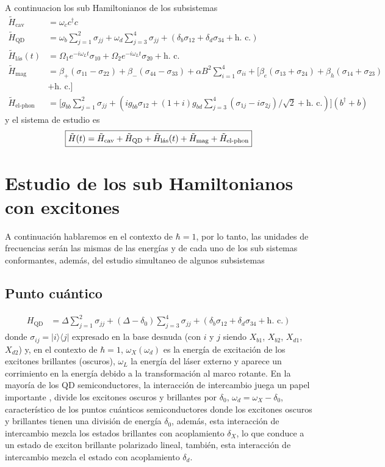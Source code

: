 \documentclass[main.tex]{subfiles}
\begin{document}
A continuacion los sub Hamiltonianos de los subsistemas
\begin{align}
    \tilde{H}_\text{cav} &= \omega_c c^\dagger c\\
    \tilde{H}_\text{QD} &= \omega_b \sum_{j=1}^{2}\sigma_{jj} + \omega_d \sum_{j=3}^{4}\sigma_{jj} + (\delta_b\sigma_{12} + \delta_d\sigma_{34} + \text{h. c.})\\
    \tilde{H}_\text{l\'as}(t) &= \Omega_1 e^{-i\omega_L t} \sigma_{10} + \Omega_2 e^{-i\omega_L t} \sigma_{20} + \text{h. c.}\\
    \tilde{H}_\text{mag} &= \beta_+ (\sigma_{11} - \sigma_{22}) + \beta_- (\sigma_{44} - \sigma_{33}) + \alpha B^2 \sum_{i = 1}^{4} \sigma_{ii} + [\beta_e (\sigma_{13} + \sigma_{24}) + \beta_h (\sigma_{14} + \sigma_{23})\\
    &+ \text{h. c.}]\\
    \tilde{H}_\text{el-phon} &= \big[ g_{bb} \sum_{j=1}^2 \sigma_{jj} + (ig_{bb}\sigma_{12} + (1+i) g_{bd} \sum_{j=3}^4 (\sigma_{1j} - i\sigma_{2j})/\sqrt{2} + \text{h. c.}) \big](b^\dagger + b)
\end{align}
y el sistema de estudio es
\[
\fbox{$\tilde{H}(t) = \tilde{H}_\text{cav} + \tilde{H}_\text{QD} + \tilde{H}_\text{l\'as}(t) + \tilde{H}_\text{mag} + \tilde{H}_\text{el-phon}$}
\]
\chapter{Estudio de los sub Hamiltonianos con excitones}
A continuación hablaremos en el contexto de $\hbar=1$, por lo tanto, las unidades de frecuencias serán las mismas de las energías y de cada uno de los sub sistemas conformantes, además, del estudio simultaneo de algunos subsistemas 
\section{Punto cuántico}
\begin{align*}
    H_\text{QD} &=  \Delta \sum_{j=1}^{2}\sigma_{jj} + (\Delta - \delta_0) \sum_{j=3}^{4}\sigma_{jj} + (\delta_b\sigma_{12} + \delta_d\sigma_{34} + \text{h. c.})
\end{align*}
donde $\sigma_{ij} =|i\rangle\langle j|$ expresado en la base desnuda (con $i$ y $j$ siendo $X_{b1}$, $X_{b2}$, $X_{d1}$, $X_{d2}$) y, en el contexto de $\hbar = 1$, $\omega_X(\omega_d)$ es la energía de excitación de los excitones brillantes (oscuros), $\omega_L$ la energía del láser externo y aparece un corrimiento en la energía debido a la transformación al marco rotante. En la mayoría de los QD semiconductores, la interacción de intercambio juega un papel importante \parencite{Bayer2002}, divide los excitones oscuros y brillantes por $\delta_0$,  $\omega_d = \omega_X -\delta_0$, característico de los puntos cuánticos semiconductores donde los excitones oscuros y brillantes tienen una división de energía $\delta_0$, además, esta interacción de intercambio mezcla los estados brillantes con acoplamiento $\delta_X$, lo que conduce a un estado de exciton brillante polarizado lineal, también, esta interacción de intercambio mezcla el estado con acoplamiento $\delta_d$. 
\end{document}
